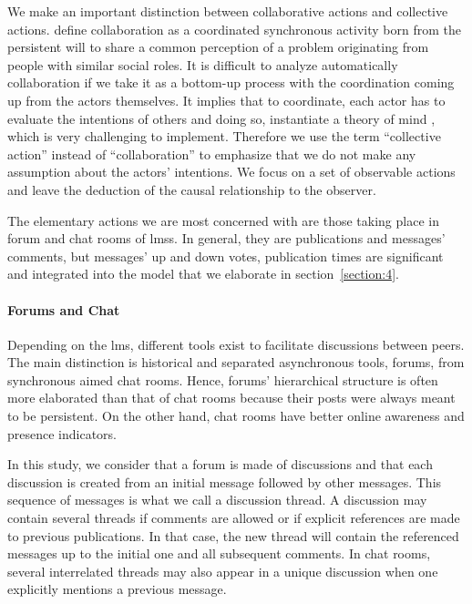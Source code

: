 \documentclass[a4paper,twoside]{article}
\begin{document}
We make an important distinction between collaborative actions and collective actions.  \cite{Dillenbourg1999} define collaboration as a coordinated synchronous activity born from the persistent will to share a common perception of a problem originating from people with similar social roles.  It is difficult to analyze automatically collaboration if we take it as a bottom-up process with the coordination coming up from the actors themselves.  It implies that to coordinate, each actor has to evaluate the intentions of others and doing so, instantiate a theory of mind \citep{Gerstenberg2017}, which is very challenging to implement.  Therefore we use the term ``collective action'' instead of ``collaboration'' to emphasize that we do not make any assumption about the actors' intentions.  We focus on a set of observable actions and leave the deduction of the causal relationship to the observer.

The elementary actions we are most concerned with are those taking place in forum and chat rooms of \glspl{lms}.  In general, they are publications and messages' comments, but messages' up and down votes, publication times are significant and integrated into the model that we elaborate in section~\ref{section:4}.

\paragraph{Forums and Chat}

Depending on the \gls{lms}, different tools exist to facilitate discussions between peers.  The main distinction is historical and separated asynchronous tools, forums, from synchronous aimed chat rooms.  Hence, forums' hierarchical structure is often more elaborated than that of chat rooms because their posts were always meant to be persistent.  On the other hand, chat rooms have better online awareness and presence indicators.

In this study, we consider that a forum is made of discussions and that each discussion is created from an initial message followed by other messages.  This sequence of messages is what we call a discussion thread.  A discussion may contain several threads if comments are allowed or if explicit references are made to previous publications.   In that case, the new thread will contain the referenced messages up to the initial one and all subsequent comments.  In chat rooms, several interrelated threads may also appear in a unique discussion when one explicitly mentions a previous message.
\end{document}
